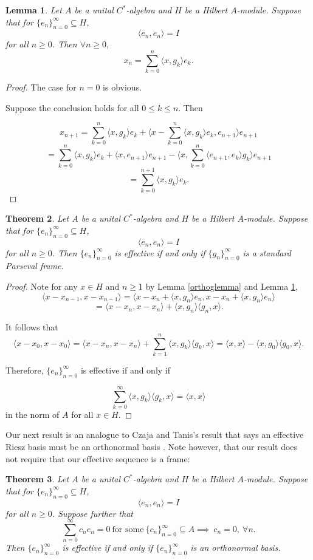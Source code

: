 \documentclass[11pt]{amsart}
\newtheorem{thm}{Theorem}[section]
\newtheorem{lem}[thm]{Lemma}
\theoremstyle{definition}
\numberwithin{equation}{section}
\begin{document}
\begin{lem}\label{auxseqform}
Let $A$ be a unital $C^{*}$-algebra and $H$ be a Hilbert $A$-module. Suppose that for $\{e_{n}\}_{n=0}^{\infty}\subseteq H$, $$\langle e_{n},e_{n}\rangle=I$$ for all $n\geq 0$.
Then $\forall n\geq 0$,
$$x_{n}=\sum_{k=0}^{n}\langle x,g_{k}\rangle e_{k}.$$
\end{lem}
\begin{proof}
The case for $n=0$ is obvious.

Suppose the conclusion holds for all $0\leq k\leq n$. Then

$$x_{n+1}=\sum_{k=0}^{n}\langle x,g_{k}\rangle e_{k}+ \langle x-\sum_{k=0}^{n}\langle x,g_{k}\rangle e_{k}, e_{n+1}\rangle e_{n+1}$$
$$=\sum_{k=0}^{n}\langle x,g_{k}\rangle e_{k} + \langle x, e_{n+1}\rangle e_{n+1} -\langle x, \sum_{k=0}^{n}\langle e_{n+1},e_{k}\rangle g_{k}\rangle e_{n+1}$$
$$=\sum_{k=0}^{n+1}\langle x, g_{k}\rangle e_{k}.$$
\end{proof}

\begin{thm}\label{pframecond}
Let $A$ be a unital $C^{*}$-algebra and $H$ be a Hilbert $A$-module. Suppose that for $\{e_{n}\}_{n=0}^{\infty}\subseteq H$, $$\langle e_{n},e_{n}\rangle=I$$ for all $n\geq 0$.
Then $\{e_{n}\}_{n=0}^{\infty}$ is effective if and only if $\{g_{n}\}_{n=0}^{\infty}$ is a standard Parseval frame.
\end{thm}

\begin{proof}

Note for any $x\in H$ and $n\geq 1$ by Lemma \ref{orthoglemma} and Lemma \ref{auxseqform},
$$\langle x-x_{n-1},x-x_{n-1} \rangle = \langle x-x_{n}+\langle x, g_{n}\rangle e_{n},x-x_{n}+\langle x, g_{n}\rangle e_{n}\rangle$$
$$=\langle x-x_{n}, x-x_{n}\rangle +\langle x,g_{n}\rangle \langle g_{n},x\rangle .$$

It follows that
$$\langle x-x_{0}, x-x_{0} \rangle =\langle x-x_{n}, x-x_{n} \rangle + \sum_{k=1}^{n}\langle x, g_{k}\rangle \langle g_{k}, x\rangle=\langle x, x\rangle -\langle x, g_{0}\rangle \langle g_{0}, x\rangle .$$

Therefore, $\{e_{n}\}_{n=0}^{\infty}$ is effective if and only if

$$\sum_{k=0}^{\infty}\langle x, g_{k}\rangle \langle g_{k}, x\rangle =\langle x,x\rangle $$ in the norm of $A$ for all $x\in H$.
\end{proof}

Our next result is an analogue to Czaja and Tanis's result that says an effective Riesz basis must be an orthonormal basis \cite{Czaja2013Kaczmarz}. Note however, that our result does not require that our effective sequence is a frame:
\begin{thm}
Let $A$ be a unital $C^{*}$-algebra and $H$ be a Hilbert $A$-module. Suppose that for $\{e_{n}\}_{n=0}^{\infty}\subseteq H$, $$\langle e_{n},e_{n}\rangle=I$$ for all $n\geq 0$.
Suppose further that $$\sum_{n=0}^{\infty}c_{n}e_{n}=0 \ \text{for some} \ \{c_{n}\}_{n=0}^{\infty}\subseteq A\implies \ c_{n}=0, \  \forall n.$$
Then $\{e_{n}\}_{n=0}^{\infty}$ is effective if and only if $\{e_{n}\}_{n=0}^{\infty}$ is an orthonormal basis.
\end{thm}
\end{document}
